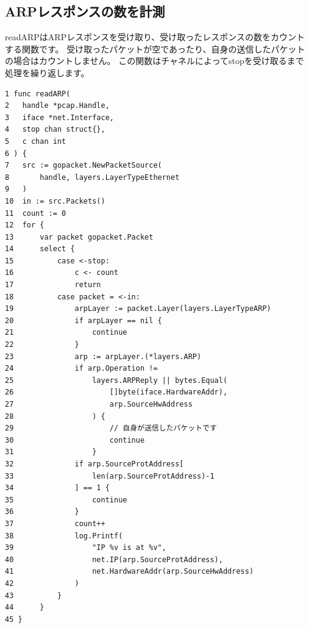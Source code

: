\subsection{ARPレスポンスの数を計測}
readARPはARPレスポンスを受け取り、受け取ったレスポンスの数をカウントする関数です。
受け取ったパケットが空であったり、自身の送信したパケットの場合はカウントしません。
この関数はチャネルによってstopを受け取るまで処理を繰り返します。
\begin{tcolorbox}[breakable]
    \begin{verbatim}
1 func readARP(
2   handle *pcap.Handle, 
3   iface *net.Interface, 
4   stop chan struct{}, 
5   c chan int
6 ) {
7   src := gopacket.NewPacketSource(
8       handle, layers.LayerTypeEthernet
9   )
10  in := src.Packets()
11  count := 0
12  for {
13      var packet gopacket.Packet
14      select {
15          case <-stop:
16              c <- count
17			    return
18	        case packet = <-in:
19			    arpLayer := packet.Layer(layers.LayerTypeARP)
20			    if arpLayer == nil {
21			        continue
22			    }
23			    arp := arpLayer.(*layers.ARP)
24			    if arp.Operation != 
25                  layers.ARPReply || bytes.Equal(
26                      []byte(iface.HardwareAddr), 
27                      arp.SourceHwAddress
28                  ) {
29		                // 自身が送信したパケットです
30		                continue
31	                }
32	            if arp.SourceProtAddress[
33                  len(arp.SourceProtAddress)-1
34              ] == 1 {
35				    continue
36			    }
37			    count++
38              log.Printf(
39                  "IP %v is at %v", 
40                  net.IP(arp.SourceProtAddress), 
41                  net.HardwareAddr(arp.SourceHwAddress)
42              )
43          }
44	    }
45 }
    \end{verbatim}
\end{tcolorbox}

